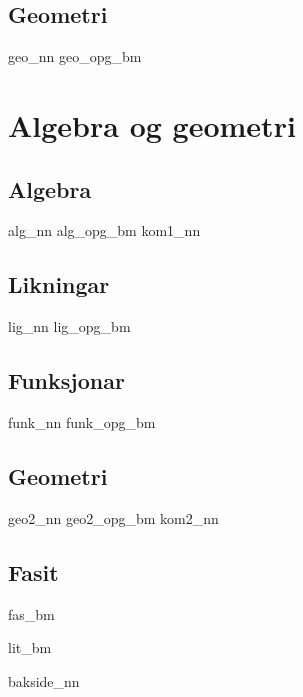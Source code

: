 	\chapter{Geometri \label{Geometri}}
	\newpage
	{geo_nn}
	{geo_opg_bm}
	
	\part{Algebra og geometri \label{Del2}}
	\chapter{Algebra \label{Algebra}}
	\newpage
	{alg_nn}
	{alg_opg_bm}
	\newpage
	{kom1_nn}
	
	\chapter{Likningar \label{Likningar}}
	\newpage
	{lig_nn}
	{lig_opg_bm}
	
	\chapter{Funksjonar \label{Funksjoner}}
	{funk_nn}
	{funk_opg_bm}
	
	\chapter{Geometri \label{Geometri2}}
	\newpage
	{geo2_nn}
	{geo2_opg_bm}
	\newpage
	{kom2_nn}
	
	\newpage
	\chapter*{Fasit}
	{fas_bm}
	
	{lit_bm}
	{\printindex {}
		}
	{bakside_nn}
	
	







